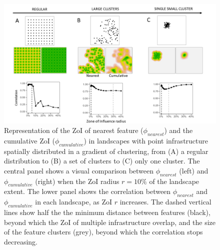 \documentclass[titlepage]{article}
\begin{document}
\begin{figure}[h]
\centering
\includegraphics[width=1.3\textwidth,center]{figures/simulated_landscapes.png}
\caption{\label{fig:simulated_landscapes} Representation of the ZoI of nearest feature ($\phi_{nearest}$) and the cumulative ZoI ($\phi_{cumulative}$) in landscapes with point infrastructure spatially distributed in a gradient of clustering, from (A) a regular distribution 
to (B) a set of clusters 
to (C) only one cluster. 
The central panel shows a visual comparison between $\phi_{nearest}$ (left) and $\phi_{cumulative}$ (right) when the ZoI radius $r = 10\%$ of the landscape extent. The lower panel shows the correlation between $\phi_{nearest}$ and $\phi_{cumulative}$ in each landscape, as ZoI $r$ increases. The dashed vertical lines show half the the minimum distance between features (black), beyond which the ZoI of multiple infrastructure overlap, and the size of the feature clusters (grey), beyond which the correlation stops decreasing.}
\end{figure}
\end{document}
